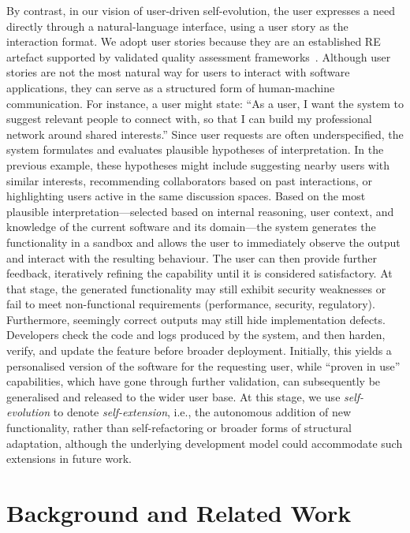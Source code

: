 \documentclass[sigconf,screen]{acmart}
\begin{document}
By contrast, in our vision of user-driven self-evolution, the user expresses a need directly through a natural-language interface, using a user story as the interaction format. We adopt user stories because they are an established RE artefact supported by validated quality assessment frameworks~\cite{lucassen2016aqusa}. Although user stories are not the most natural way for users to interact with software applications, they can serve as a structured form of human-machine communication. For instance, a user might state: ``As a user, I want the system to suggest relevant people to connect with, so that I can build my professional network around shared interests.'' Since user requests are often underspecified, the system formulates and evaluates plausible hypotheses of interpretation. In the previous example, these hypotheses might include suggesting nearby users with similar interests, recommending collaborators based on past interactions, or highlighting users active in the same discussion spaces. Based on the most plausible interpretation---selected based on internal reasoning, user context, and knowledge of the current software and its domain---the system generates the functionality in a sandbox and allows the user to immediately observe the output and interact with the resulting behaviour. The user can then provide further feedback, iteratively refining the capability until it is considered satisfactory. At that stage, the generated functionality may still exhibit security weaknesses or fail to meet non-functional requirements (performance, security, regulatory). Furthermore, seemingly correct outputs may still hide implementation defects. Developers check the code and logs produced by the system, and then harden, verify, and update the feature before broader deployment. Initially, this yields a personalised version of the software for the requesting user, while ``proven in use'' capabilities, which have gone through further validation, can subsequently be generalised and released to the wider user base. At this stage, we use \textit{self-evolution} to denote \textit{self-extension}, i.e., the autonomous addition of new functionality, rather than self-refactoring or broader forms of structural adaptation, although the underlying development model could accommodate such extensions in future work.

\section{Background and Related Work}\label{sec:background}
\end{document}
